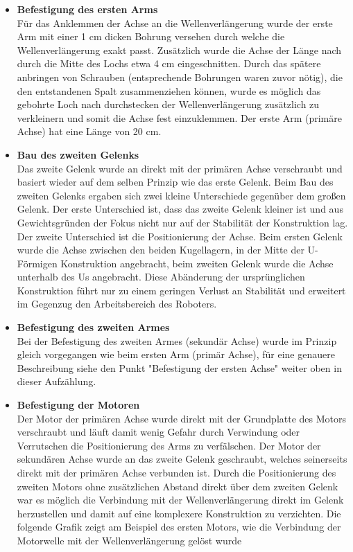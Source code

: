 \begin{itemize}
\item \textbf{Befestigung des ersten Arms}\\
Für das Anklemmen der Achse an die Wellenverlängerung wurde der erste Arm mit einer 1 cm dicken Bohrung versehen durch welche die Wellenverlängerung exakt passt. Zusätzlich wurde die Achse der Länge nach durch die Mitte des Lochs etwa 4 cm eingeschnitten. Durch das spätere anbringen von Schrauben (entsprechende Bohrungen waren zuvor nötig), die den entstandenen Spalt zusammenziehen können, wurde es möglich das gebohrte Loch nach durchstecken der Wellenverlängerung zusätzlich zu verkleinern und somit die Achse fest einzuklemmen.
Der erste Arm (primäre Achse) hat eine Länge von 20 cm.
\item \textbf{Bau des zweiten Gelenks}\\
Das zweite Gelenk wurde an direkt mit der primären Achse verschraubt und basiert wieder auf dem selben Prinzip wie das erste Gelenk. Beim Bau des zweiten Gelenks ergaben sich zwei kleine Unterschiede gegenüber dem großen Gelenk. Der erste Unterschied ist, dass das zweite Gelenk kleiner ist und aus Gewichtsgründen der Fokus nicht nur auf der Stabilität der Konstruktion lag. 
Der zweite Unterschied ist die Positionierung der Achse. Beim ersten Gelenk wurde die Achse zwischen den beiden Kugellagern, in der Mitte der U-Förmigen Konstruktion angebracht, beim zweiten Gelenk wurde die Achse unterhalb des Us angebracht. Diese Abänderung der ursprünglichen Konstruktion führt nur zu einem geringen Verlust an Stabilität und erweitert im Gegenzug den Arbeitsbereich des Roboters.
\item \textbf{Befestigung des zweiten Armes}\\
Bei der Befestigung des zweiten Armes (sekundär Achse) wurde im Prinzip gleich vorgegangen wie beim ersten Arm (primär Achse), für eine genauere Beschreibung siehe den Punkt "Befestigung der ersten Achse" weiter oben in dieser Aufzählung.
\item \textbf{Befestigung der Motoren}\\
Der Motor der primären Achse wurde direkt mit der Grundplatte des Motors verschraubt und läuft damit wenig Gefahr durch Verwindung oder Verrutschen die Positionierung des Arms zu verfälschen.
Der Motor der sekundären Achse wurde an das zweite Gelenk geschraubt, welches seinerseits direkt mit der primären Achse verbunden ist. Durch die Positionierung des zweiten Motors ohne zusätzlichen Abstand direkt über dem zweiten Gelenk war es möglich die Verbindung mit der Wellenverlängerung direkt im Gelenk herzustellen und damit auf eine komplexere Konstruktion zu verzichten. Die folgende Grafik zeigt am Beispiel des ersten Motors, wie die Verbindung der Motorwelle mit der Wellenverlängerung gelöst wurde
\end{itemize}
